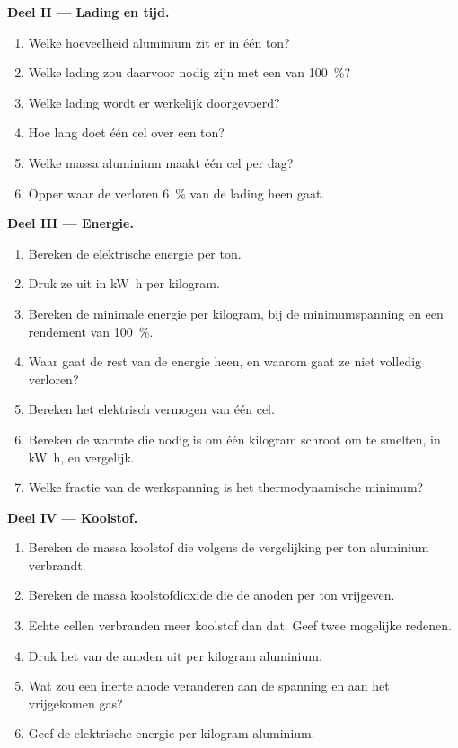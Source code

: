\begin{problem}
\medskip
\noindent\textbf{Deel II --- Lading en tijd.}
\begin{enumerate}[resume]
  \item Welke hoeveelheid aluminium zit er in één ton?
  \item Welke lading zou daarvoor nodig zijn met een  van 100~\%?
  \item Welke lading wordt er werkelijk doorgevoerd?
  \item Hoe lang doet één cel over een ton?
  \item Welke massa aluminium maakt één cel per dag?
  \item Opper waar de verloren 6~\% van de lading heen gaat.
\end{enumerate}

\medskip
\noindent\textbf{Deel III --- Energie.}
\begin{enumerate}[resume]
  \item Bereken de elektrische energie per ton.
  \item Druk ze uit in \unit{kW.h} per kilogram.
  \item Bereken de minimale energie per kilogram, bij de minimumspanning en
        een rendement van 100~\%.
  \item Waar gaat de rest van de energie heen, en waarom gaat ze niet volledig
        verloren?
  \item Bereken het elektrisch vermogen van één cel.
  \item Bereken de warmte die nodig is om één kilogram schroot om te smelten, in
        \unit{kW.h}, en vergelijk.
  \item Welke fractie van de werkspanning is het thermodynamische minimum?
\end{enumerate}

\medskip
\noindent\textbf{Deel IV --- Koolstof.}
\begin{enumerate}[resume]
  \item Bereken de massa koolstof die volgens de vergelijking per ton aluminium verbrandt.
  \item Bereken de massa koolstofdioxide die de anoden per ton vrijgeven.
  \item Echte cellen verbranden meer koolstof dan dat. Geef twee mogelijke redenen.
  \item Druk het  van de anoden uit per kilogram aluminium.
  \item Wat zou een inerte anode veranderen aan de spanning en aan het vrijgekomen
        gas?
  \item Geef de elektrische energie per kilogram aluminium.
\end{enumerate}
\end{problem}
